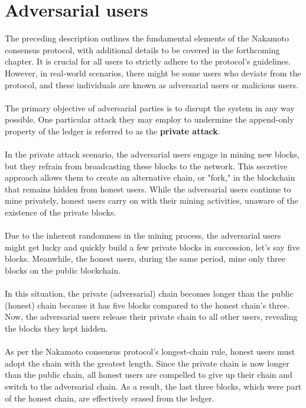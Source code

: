 \documentclass{report}
\begin{document}
\section{Adversarial users}
The preceding description outlines the fundamental elements of the Nakamoto consensus protocol, with additional details to be covered in the forthcoming chapter. It is crucial for all users to strictly adhere to the protocol's guidelines. However, in real-world scenarios, there might be some users who deviate from the protocol, and these individuals are known as adversarial users or malicious users.\\\\
The primary objective of adversarial parties is to disrupt the system in any way possible. One particular attack they may employ to undermine the append-only property of the ledger is referred to as the \textbf{private attack}.\\\\
In the private attack scenario, the adversarial users engage in mining new blocks, but they refrain from broadcasting these blocks to the network. This secretive approach allows them to create an alternative chain, or "fork," in the blockchain that remains hidden from honest users. While the adversarial users continue to mine privately, honest users carry on with their mining activities, unaware of the existence of the private blocks.\\\\
Due to the inherent randomness in the mining process, the adversarial users might get lucky and quickly build a few private blocks in succession, let's say five blocks. Meanwhile, the honest users, during the same period, mine only three blocks on the public blockchain.\\\\
In this situation, the private (adversarial) chain becomes longer than the public (honest) chain because it has five blocks compared to the honest chain's three. Now, the adversarial users release their private chain to all other users, revealing the blocks they kept hidden.\\\\
As per the Nakamoto consensus protocol's longest-chain rule, honest users must adopt the chain with the greatest length. Since the private chain is now longer than the public chain, all honest users are compelled to give up their chain and switch to the adversarial chain. As a result, the last three blocks, which were part of the honest chain, are effectively erased from the ledger.\\\\
\end{document}
